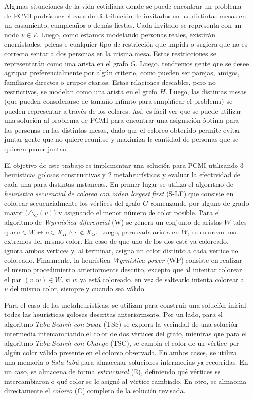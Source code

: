 Algunas situaciones de la vida cotidiana donde se puede encontrar un problema de PCMI podría ser el caso de distribución de invitados en las distintas mesas en un casamiento, cumpleaños o demás fiestas. Cada invitado se representa con un nodo $v\in V$. Luego, como estamos modelando personas reales, existirán enemistades, peleas o cualquier tipo de restricción que impida o sugiera que no es correcto sentar a dos personas en la misma mesa. Estas restricciones se representarán como una arista en el grafo $G$. Luego, tendremos gente que se desee agrupar preferencialmente por algún criterio, como pueden ser parejas, amigos, familiares directos o grupos etarios. Estas relaciones deseables, pero no restrictivas, se modelan como una arista en el grafo $H$. Luego, las distintas mesas (que pueden considerarse de tamaño infinito para simplificar el problema) se pueden representar a través de los colores. Así, es fácil ver que se puede utilizar una solución al problema de PCMI para encontrar una asignación óptima para las personas en las distintas mesas, dado que el coloreo obtenido permite evitar juntar gente que no quiere reunirse y maximiza la cantidad de personas que se quieren poner juntas.

El objetivo de este trabajo es implementar una solución para PCMI utilizando 3 heurísticas golosas constructivas y 2 metaheurísticas y evaluar la efectividad de cada una para distintas instancias. En primer lugar se utiliza el algoritmo de \textit{heurística secuencial de coloreo con orden largest first} (S-LF) que consiste en colorear secuencialmente los vértices del grafo $G$ comenzando por alguno de grado mayor ($\triangle_G(v)$) y asignando el menor número de color posible. Para el algoritmo de \textit{Wyrnística diferencial} (W) se genera un conjunto de aristas $W$ tales que $e \in W \iff e \in X_H \wedge e \not\in X_G$. Luego, para cada arista en $W$, se colorean sus extremos del mismo color. En caso de que uno de los dos esté ya coloreado, ignora ambos vértices y, al terminar, asigna un color distinto a cada vértice no coloreado. Finalmente, la heurística \textit{Wyrnística power} (WP) consiste en realizar el mismo procedimiento anteriormente descrito, excepto que al intentar colorear el par $(v, w) \in W$, si $w$ ya está coloreado, en vez de saltearlo intenta colorear a $v$ del mismo color, siempre y cuando sea válido.

Para el caso de las metaheurísticas, se utilizan para construir una solución inicial todas las heurísticas golosas descritas anteriormente. Por un lado, para el algoritmo \textit{Tabu Search con Swap} (TSS) se explora la vecindad de una solución intermedia intercambiando el color de dos vértices del grafo, mientras que para el algoritmo \textit{Tabu Search con Change} (TSC), se cambia el color de un vértice por algún color válido presente en el coloreo observado. En ambos casos, se utiliza una memoria o \textit{lista tabú} para almacenar soluciones intermedias ya recorridas. En un caso, se almacena de forma \textit{estructural} (E), definiendo qué vértices se intercambiaron o qué color se le asignó al vértice cambiado. En otro, se almacena directamente el \textit{coloreo} (C) completo de la solución revisada.

